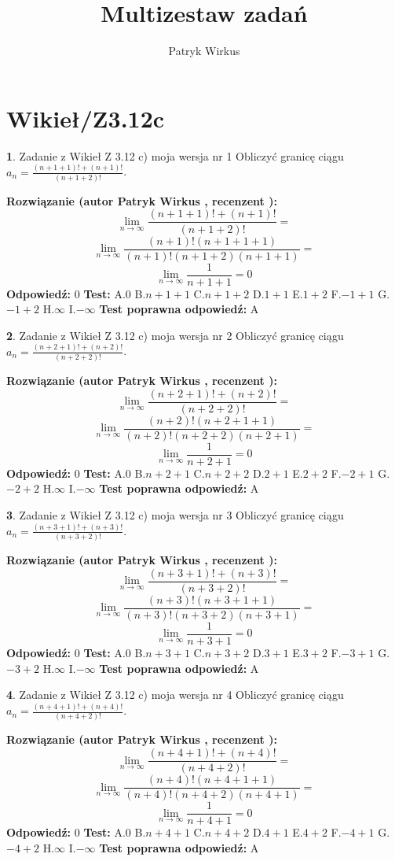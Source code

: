 \documentclass[12pt, a4paper]{article}
\title{Multizestaw zadań}
\author{Patryk Wirkus}
\date{}
\theoremstyle{definition} %
\newtheorem{zad}{}
\newcommand{\kategoria}[1]{\section{#1}}
\newcommand{\zadStart}[1]{\begin{zad}#1\newline}
\newcommand{\zadStop}{\end{zad}}
\newcommand{\rozwStart}[2]{\noindent \textbf{Rozwiązanie (autor #1 , recenzent #2): }\newline}
\newcommand{\rozwStop}{\newline}
\newcommand{\odpStart}{\noindent \textbf{Odpowiedź:}\newline}
\newcommand{\odpStop}{\newline}
\newcommand{\testStart}{\noindent \textbf{Test:}\newline}
\newcommand{\testStop}{\newline}
\newcommand{\kluczStart}{\noindent \textbf{Test poprawna odpowiedź:}\newline}
\newcommand{\kluczStop}{\newline}
\begin{document}
\maketitle

\kategoria{Wikieł/Z3.12c}


\zadStart{Zadanie z Wikieł Z 3.12 c) moja wersja nr 1}
Obliczyć granicę ciągu $a_{n}=\frac{(n+1+1)!+(n+1)!}{(n+1+2)!}$.
\zadStop
\rozwStart{Patryk Wirkus}{}
$$\lim\limits_{n\to\infty}\frac{(n+1+1)!+(n+1)!}{(n+1+2)!}=$$
$$\lim\limits_{n\to\infty}\frac{(n+1)!(n+1+1+1)}{(n+1)!(n+1+2)(n+1+1)}=$$
$$\lim\limits_{n\to\infty}\frac{1}{n+1+1}= 0$$
\rozwStop
\odpStart
$0$
\odpStop
\testStart
A.$0$
B.$n+1+1$
C.$n+1+2$
D.$1+1$
E.$1+2$
F.$-1+1$
G.$-1+2$
H.$\infty$
I.$-\infty$
\testStop
\kluczStart
A
\kluczStop



\zadStart{Zadanie z Wikieł Z 3.12 c) moja wersja nr 2}
Obliczyć granicę ciągu $a_{n}=\frac{(n+2+1)!+(n+2)!}{(n+2+2)!}$.
\zadStop
\rozwStart{Patryk Wirkus}{}
$$\lim\limits_{n\to\infty}\frac{(n+2+1)!+(n+2)!}{(n+2+2)!}=$$
$$\lim\limits_{n\to\infty}\frac{(n+2)!(n+2+1+1)}{(n+2)!(n+2+2)(n+2+1)}=$$
$$\lim\limits_{n\to\infty}\frac{1}{n+2+1}= 0$$
\rozwStop
\odpStart
$0$
\odpStop
\testStart
A.$0$
B.$n+2+1$
C.$n+2+2$
D.$2+1$
E.$2+2$
F.$-2+1$
G.$-2+2$
H.$\infty$
I.$-\infty$
\testStop
\kluczStart
A
\kluczStop



\zadStart{Zadanie z Wikieł Z 3.12 c) moja wersja nr 3}
Obliczyć granicę ciągu $a_{n}=\frac{(n+3+1)!+(n+3)!}{(n+3+2)!}$.
\zadStop
\rozwStart{Patryk Wirkus}{}
$$\lim\limits_{n\to\infty}\frac{(n+3+1)!+(n+3)!}{(n+3+2)!}=$$
$$\lim\limits_{n\to\infty}\frac{(n+3)!(n+3+1+1)}{(n+3)!(n+3+2)(n+3+1)}=$$
$$\lim\limits_{n\to\infty}\frac{1}{n+3+1}= 0$$
\rozwStop
\odpStart
$0$
\odpStop
\testStart
A.$0$
B.$n+3+1$
C.$n+3+2$
D.$3+1$
E.$3+2$
F.$-3+1$
G.$-3+2$
H.$\infty$
I.$-\infty$
\testStop
\kluczStart
A
\kluczStop



\zadStart{Zadanie z Wikieł Z 3.12 c) moja wersja nr 4}
Obliczyć granicę ciągu $a_{n}=\frac{(n+4+1)!+(n+4)!}{(n+4+2)!}$.
\zadStop
\rozwStart{Patryk Wirkus}{}
$$\lim\limits_{n\to\infty}\frac{(n+4+1)!+(n+4)!}{(n+4+2)!}=$$
$$\lim\limits_{n\to\infty}\frac{(n+4)!(n+4+1+1)}{(n+4)!(n+4+2)(n+4+1)}=$$
$$\lim\limits_{n\to\infty}\frac{1}{n+4+1}= 0$$
\rozwStop
\odpStart
$0$
\odpStop
\testStart
A.$0$
B.$n+4+1$
C.$n+4+2$
D.$4+1$
E.$4+2$
F.$-4+1$
G.$-4+2$
H.$\infty$
I.$-\infty$
\testStop
\kluczStart
A
\kluczStop
\end{document}
